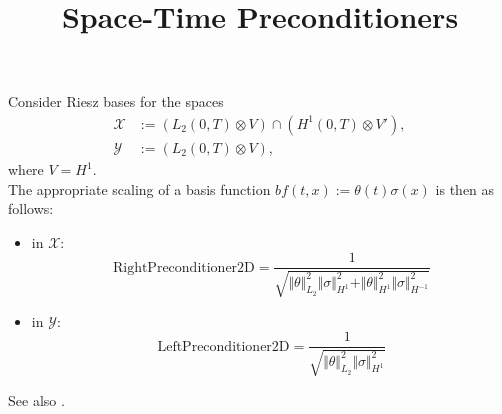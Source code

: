 \documentclass[11pt, fleqn]{article}
\begin{document}
\title{Space-Time Preconditioners}
\author{}
\date{}
\maketitle

\noindent Consider Riesz bases for the spaces
\begin{align*}
\mathcal{X} &:= (L_{2}(0,T) \otimes V) \cap ( H^{1}(0,T) \otimes V'), \\
\mathcal{Y} &:= (L_{2}(0,T) \otimes V),
\end{align*}
where $V = H^{1}$. \\

\noindent The appropriate scaling of a basis function $bf(t,x) := \theta(t)  \sigma(x)$ is then as follows:
\begin{itemize}
\item in $\mathcal X$: \[ \text{RightPreconditioner2D} = \frac{1}{\sqrt{\Vert \theta \Vert_{L_{2}}^{2} \Vert \sigma \Vert_{H^{1}}^{2} + \Vert \theta \Vert_{H^{1}}^{2} \Vert \sigma \Vert_{H^{-1}}^{2}}} \]
\item in $\mathcal Y$: \[ \text{LeftPreconditioner2D} = \frac{1}{\sqrt{\Vert \theta \Vert_{L_{2}}^{2} \Vert \sigma \Vert_{H^{1}}^{2} }} \]
\end{itemize}
See also \cite{SchwabStevenson}. \\
\end{document}
